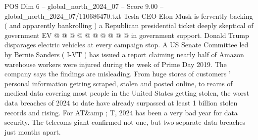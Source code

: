 \begin{textsample}{POS Dim 6 – global\_north\_2024\_07 – Score 9.00 – global\_north\_2024\_07/110686470.txt}
Tesla CEO Elon Musk is fervently backing ( and apparently bankrolling ) a Republican presidential ticket deeply skeptical of government EV @ @ @ @ @ @ @ @ @ @ in government support.
Donald Trump disparages electric vehicles at every campaign stop.
A US Senate Committee led by Bernie Sanders ( I-VT ) has issued a report claiming nearly half of Amazon warehouse workers were injured during the week of Prime Day 2019.
The company says the findings are misleading.
From huge stores of customers ' personal information getting scraped, stolen and posted online, to reams of medical data covering most people in the United States getting stolen, the worst data breaches of 2024 to date have already surpassed at least 1 billion stolen records and rising.
For AT\&amp ; T, 2024 has been a very bad year for data security.
The telecoms giant confirmed not one, but two separate data breaches just months apart.

\end{textsample}
